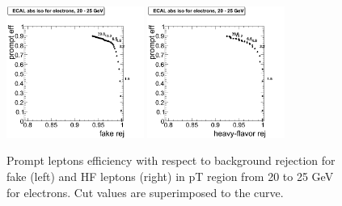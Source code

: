 \begin{figure}[htbp]
\begin{center}
 \includegraphics[width = 0.4\textwidth]{pictures/trackCut/bkgdRej_sigEff/elec_fake_ptCut3_ptCut4.png}
\includegraphics[width = 0.4\textwidth]{pictures/trackCut/bkgdRej_sigEff/elec_nonPrompt_ptCut3_ptCut4.png}
\caption{\small{Prompt leptons efficiency with respect to background 
rejection for fake (left) and HF leptons (right) in pT region
from 20 to 25 GeV for electrons. 
Cut values are superimposed to the curve.}\label{fig:ecalrej_el4}}
\end{center}
\end{figure}


